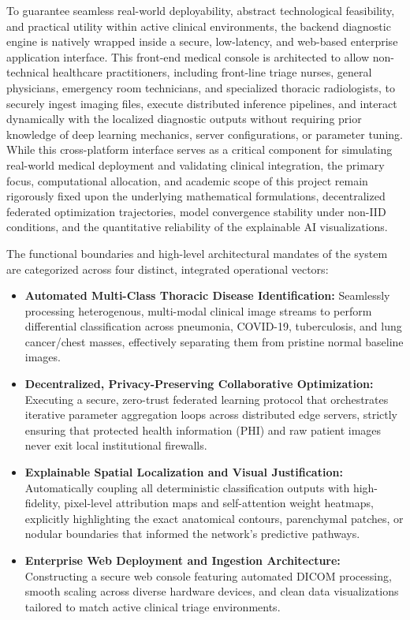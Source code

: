 To guarantee seamless real-world deployability, abstract technological feasibility, and practical utility within active clinical environments, the backend diagnostic engine is natively wrapped inside a secure, low-latency, and web-based enterprise application interface. This front-end medical console is architected to allow non-technical healthcare practitioners, including front-line triage nurses, general physicians, emergency room technicians, and specialized thoracic radiologists, to securely ingest imaging files, execute distributed inference pipelines, and interact dynamically with the localized diagnostic outputs without requiring prior knowledge of deep learning mechanics, server configurations, or parameter tuning. While this cross-platform interface serves as a critical component for simulating real-world medical deployment and validating clinical integration, the primary focus, computational allocation, and academic scope of this project remain rigorously fixed upon the underlying mathematical formulations, decentralized federated optimization trajectories, model convergence stability under non-IID conditions, and the quantitative reliability of the explainable AI visualizations.

The functional boundaries and high-level architectural mandates of the system are categorized across four distinct, integrated operational vectors:

\begin{itemize}
	\item \textbf{Automated Multi-Class Thoracic Disease Identification:} Seamlessly processing heterogenous, multi-modal clinical image streams to perform differential classification across pneumonia, COVID-19, tuberculosis, and lung cancer/chest masses, effectively separating them from pristine normal baseline images.
	\item \textbf{Decentralized, Privacy-Preserving Collaborative Optimization:} Executing a secure, zero-trust federated learning protocol that orchestrates iterative parameter aggregation loops across distributed edge servers, strictly ensuring that protected health information (PHI) and raw patient images never exit local institutional firewalls.
	\item \textbf{Explainable Spatial Localization and Visual Justification:} Automatically coupling all deterministic classification outputs with high-fidelity, pixel-level attribution maps and self-attention weight heatmaps, explicitly highlighting the exact anatomical contours, parenchymal patches, or nodular boundaries that informed the network's predictive pathways.
	\item \textbf{Enterprise Web Deployment and Ingestion Architecture:} Constructing a secure web console featuring automated DICOM processing, smooth scaling across diverse hardware devices, and clean data visualizations tailored to match active clinical triage environments.
\end{itemize}

